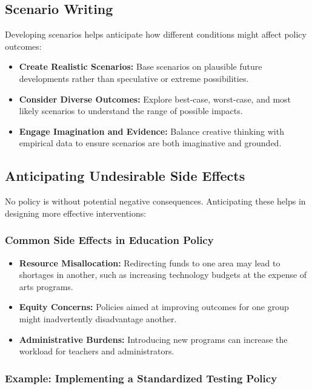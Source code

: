 \documentclass{article}
\theoremstyle{definition}
\theoremstyle{plain}
\begin{document}
\subsection{Scenario Writing}

Developing scenarios helps anticipate how different conditions might affect policy outcomes:

\begin{itemize}
    \item \textbf{Create Realistic Scenarios:} Base scenarios on plausible future developments rather than speculative or extreme possibilities.
    \item \textbf{Consider Diverse Outcomes:} Explore best-case, worst-case, and most likely scenarios to understand the range of possible impacts.
    \item \textbf{Engage Imagination and Evidence:} Balance creative thinking with empirical data to ensure scenarios are both imaginative and grounded.
\end{itemize}

\subsection{Anticipating Undesirable Side Effects}

No policy is without potential negative consequences. Anticipating these helps in designing more effective interventions:

\subsubsection{Common Side Effects in Education Policy}

\begin{itemize}
    \item \textbf{Resource Misallocation:} Redirecting funds to one area may lead to shortages in another, such as increasing technology budgets at the expense of arts programs.
    \item \textbf{Equity Concerns:} Policies aimed at improving outcomes for one group might inadvertently disadvantage another.
    \item \textbf{Administrative Burdens:} Introducing new programs can increase the workload for teachers and administrators.
\end{itemize}

\subsubsection{Example: Implementing a Standardized Testing Policy}
\end{document}
